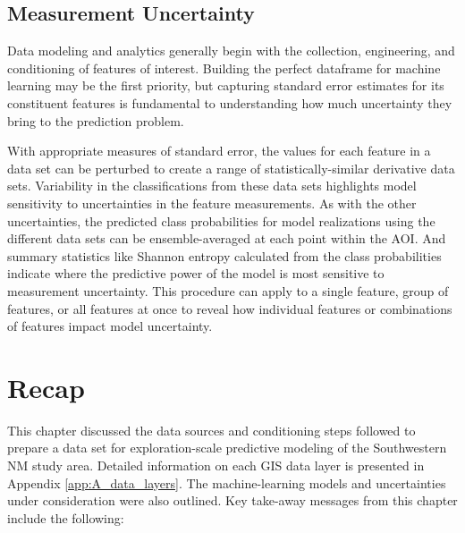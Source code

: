 \subsection{Measurement Uncertainty}\label{ch3:measure_uncertainty}

Data modeling and analytics generally begin with the collection, engineering, and conditioning of features of interest. Building the perfect dataframe for machine learning may be the first priority, but capturing standard error estimates for its constituent features is fundamental to understanding how much uncertainty they bring to the prediction problem.

With appropriate measures of standard error, the values for each feature in a data set can be perturbed to create a range of statistically-similar derivative data sets. Variability in the classifications from these data sets highlights model sensitivity to uncertainties in the feature measurements. As with the other uncertainties, the predicted class probabilities for model realizations using the different data sets can be ensemble-averaged at each point within the AOI. And summary statistics like Shannon entropy calculated from the class probabilities indicate where the predictive power of the model is most sensitive to measurement uncertainty. This procedure can apply to a single feature, group of features, or all features at once to reveal how individual features or combinations of features impact model uncertainty.

\section{Recap}\label{ch3:recap}
This chapter discussed the data sources and conditioning steps followed to prepare a data set for exploration-scale predictive modeling of the Southwestern NM study area. Detailed information on each GIS data layer is presented in Appendix \ref{app:A_data_layers}. The machine-learning models and uncertainties under consideration were also outlined. Key take-away messages from this chapter include the following:

